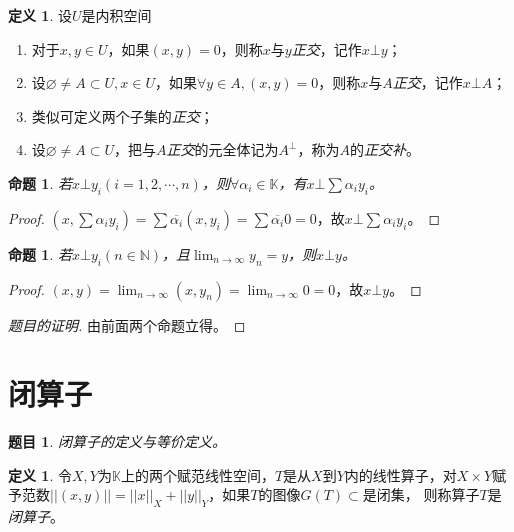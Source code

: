 \documentclass[winfonts,UTF8,c5size,a4paper,fancyhdr,hyperref,titlepage,nocap]{ctexart}
\theoremstyle{question}
\newtheorem{Qut}{题目}
\theoremstyle{theorem}
\newtheorem{prop}[thm]{命题}
\theoremstyle{definition}
\newtheorem{defn}[thm]{定义}
\theoremstyle{remark}
\numberwithin{equation}{subsection}
\newcommand{\N}{\mathbb{N}}
\newcommand{\K}{\mathbb{K}}
\newcommand{\red}{\color{red}}
\begin{document}
\begin{defn}
  设$U$是内积空间
\begin{enumerate}[1)]
    \setlength{\itemindent}{2ex}
    \item 对于$x,y\in U$，如果$(x,y)=0$，则称$x$与$y$\emph{\red 正交}，记作$x\bot y$；
    \item 设$\varnothing\neq A\subset U, x\in U$，如果$\forall y\in A, (x,y)=0$，则称$x$与$A$\emph{\red 正交}，记作$x\bot A$；
    \item 类似可定义两个子集的\emph{\red 正交}；
    \item 设$\varnothing\neq A\subset U$，把与$A$\emph{\red 正交}的元全体记为$A^{\bot}$，称为$A$的\emph{\red 正交补}。
\end{enumerate}
\end{defn}

\begin{prop}
  若$x\bot y_i(i=1,2,\cdots,n)$，则$\forall\alpha_i\in\K$，有$x\bot \sum\alpha_iy_i$。
\end{prop}
\begin{proof}
$(x,\sum\alpha_iy_i) =\sum\overline{\alpha_i}(x,y_i) =\sum\overline{\alpha_i}0=0$，故$x\bot \sum\alpha_iy_i$。
\end{proof}

\begin{prop}
  若$x\bot y_i(n\in\N)$，且$\lim_{n\to\infty}y_n=y$，则$x\bot y$。
\end{prop}
\begin{proof}
  $(x,y)=\lim_{n\to\infty}(x,y_n)=\lim_{n\to\infty}0=0$，故$x\bot y$。
\end{proof}

\begin{proof}[题目的证明]
由前面两个命题立得。
\end{proof}

\section{闭算子}
\begin{Qut}
  闭算子的定义与等价定义。
\end{Qut}
\begin{defn}
  令$X,Y$为$\K$上的两个赋范线性空间，$T$是从$X$到$Y$内的线性算子，对$X\times Y$赋予范数$||(x,y)||=||x||_X+||y||_Y$，如果$T$的图像$G(T)\subset$是闭集，
  则称算子$T$是\emph{\red 闭算子}。
\end{defn}
\end{document}
